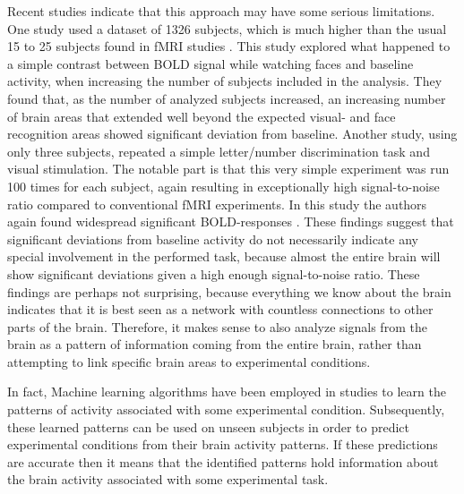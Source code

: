 \documentclass[preprint,journal,11pt]{vgtc}
\begin{document}
Recent studies indicate that this approach may have some serious limitations. One study used a dataset of 1326 subjects, which is much higher than the usual 15 to 25 subjects found in fMRI studies \cite{thy:2012very}. This study explored what happened to a simple contrast between BOLD signal while watching faces and baseline activity, when increasing the number of subjects included in the analysis. They found that, as the number of analyzed subjects increased, an increasing number of brain areas that extended well beyond the expected visual- and face recognition areas showed significant deviation from baseline. Another study, using only three subjects, repeated a simple letter/number discrimination task and visual stimulation. The notable part is that this very simple experiment was run 100 times for each subject, again resulting in exceptionally high signal-to-noise ratio compared to conventional fMRI experiments. In this study the authors again found widespread significant BOLD-responses \cite{go:2012whole}. These findings suggest that significant deviations from baseline activity do not necessarily indicate any special involvement in the performed task, because almost the entire brain will show significant deviations given a high enough signal-to-noise ratio. These findings are perhaps not surprising, because everything we know about the brain indicates that it is best seen as a network with countless connections to other parts of the brain. Therefore, it makes sense to also analyze signals from the brain as a pattern of information coming from the entire brain, rather than attempting to link specific brain areas to experimental conditions.

In fact, Machine learning algorithms have been employed in studies to learn the patterns of activity associated with some experimental condition. Subsequently, these learned patterns can be used on unseen subjects in order to predict experimental conditions from their brain activity patterns. If these predictions are accurate then it means that the identified patterns hold information about the brain activity associated with some experimental task.
\end{document}
